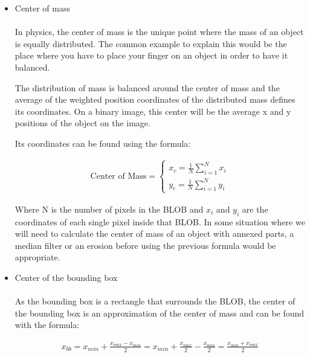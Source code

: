 \begin{itemize}
\item Center of mass
\\
\\
In physics, the center of mass is the unique point where the mass of an object is equally distributed. The common example to explain this would be the place where you have to place your finger on an object in order to have it balanced.

The distribution of mass is balanced around the center of mass and the average of the weighted position coordinates of the distributed mass defines its coordinates. On a binary image, this center will be the average x and y positions of the object on the image.

Its coordinates can be found using the formula:

\begin{equation}
	\begin{aligned}
  		\ \text{Center of Mass} = \left\{ \begin{array}{ll}
         x_{c}=\displaystyle\frac{1}{N} \displaystyle\sum_{i=1}^N x_{i}\\
         y_{c}=\displaystyle\frac{1}{N} \displaystyle\sum_{i=1}^N y_{i}
        \end{array} \right . \ 
 	\end{aligned}
\end{equation} 


Where N is the number of pixels in the BLOB and $x_i$ and $y_i$ are the coordinates of each single pixel inside that BLOB. In some situation where we will need to calculate the center of mass of an object with annexed parts, a median filter or an erosion before using the previous formula would be appropriate.

\item Center of the bounding box
\\
\\
As the bounding box is a rectangle that surrounds the BLOB, the center of the bounding box is an approximation of the center of mass and can be found with the formula:

\begin{equation}
	\begin{aligned}	x_{bb}=x_{min}+\displaystyle\frac{x_{max}-x_{min}}{2}=x_{min}+\displaystyle\frac{x_{max}}{2}-\displaystyle\frac{x_{min}}{2}=\displaystyle\frac{x_{min}+x_{max}}{2}
	\label{BoundingBoxCenterX}
	\end{aligned}
\end{equation}


\end{itemize}

